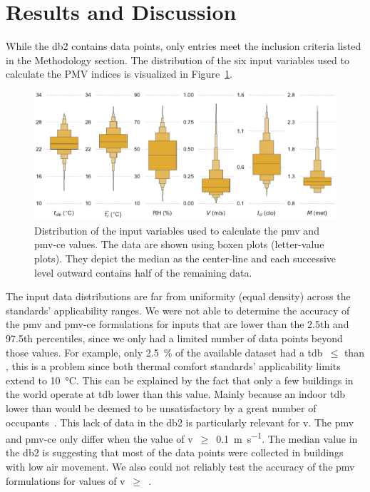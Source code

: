 \section{Results and Discussion}\label{sec:results}
While the \ac{db2} contains  data points, only  entries meet the inclusion criteria listed in the Methodology section.
The distribution of the six input variables used to calculate the PMV indices is visualized in Figure~\ref{fig:dist_input_data}.
\begin{figure}[htb!]
    \centering
    \includegraphics[width=\textwidth]{figures/dist_input_data}
    \caption{Distribution of the input variables used to calculate the \ac{pmv} and \ac{pmv-ce} values.
    The data are shown using boxen plots (letter-value plots).
    They depict the median as the center-line and each successive level outward contains half of the remaining data.}
    \label{fig:dist_input_data}
\end{figure}
The input data distributions are far from uniformity (equal density) across the standards' applicability ranges.
We were not able to determine the accuracy of the \ac{pmv} and \ac{pmv-ce} formulations for inputs that are lower than the 2.5th and 97.5th percentiles, since we only had a limited number of data points beyond those values.
For example, only \qty{2.5}{\percent} of the available dataset had a \ac{tdb}~$\leq$ than , this is a problem since both thermal comfort standards' applicability limits extend to \qty{10}{\celsius}.
This can be explained by the fact that only a few buildings in the world operate at \ac{tdb} lower than this value.
Mainly because an indoor \ac{tdb} lower than  would be deemed to be unsatisfactory by a great number of occupants~\cite{iso7730}.
This lack of data in the \ac{db2} is particularly relevant for \ac{v}.
The \ac{pmv} and \ac{pmv-ce} only differ when the value of \ac{v}~$\geq$~\qty{0.1}{\m\per\s}.
The median value in the \ac{db2} is  suggesting that most of the data points were collected in buildings with low air movement.
We also could not reliably test the accuracy of the \ac{pmv} formulations for values of \ac{v}~$\geq$~.

